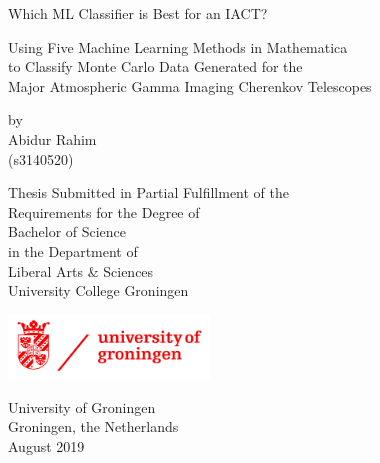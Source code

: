 \begin{titlepage}
    \begin{center}
        \vspace*{1cm}
        
        \sc
        
        \Large
        Which ML Classifier is Best for an IACT?
        
        \vspace{0.5cm}
        
        \normalsize
        Using Five Machine Learning Methods in Mathematica \\ to Classify Monte Carlo Data Generated for the  \\ Major Atmospheric Gamma Imaging Cherenkov Telescopes
        
        
        
        \normalsize
        \vspace{1cm}
 
        by \\
        \large
        Abidur Rahim \\
        \normalsize
        (s3140520)
        \vfill
 
        Thesis Submitted in Partial Fulfillment of the \\
        Requirements for the Degree of \\
        Bachelor of Science \\
        in the Department of \\
        Liberal Arts \& Sciences \\
        University College Groningen
 
        \vspace{0.5cm}
 
        \includegraphics[width=0.4\textwidth]{im/rug_logo.png}
 
        University of Groningen\\
        Groningen, the Netherlands\\
        August 2019
 
    \end{center}
\end{titlepage}